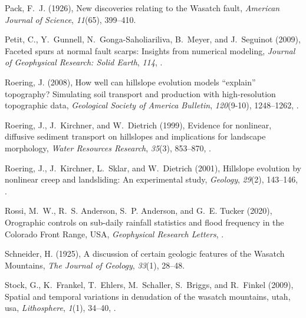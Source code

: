 \begin{thebibliography}{50}
Pack, F.~J. (1926), {New discoveries relating to the Wasatch fault},
  \textit{American Journal of Science}, \textit{11}(65), 399--410.

Petit, C., Y.~Gunnell, N.~Gonga-Saholiariliva, B.~Meyer, and J.~Seguinot
  ({2009}), {Faceted spurs at normal fault scarps: Insights from numerical
  modeling}, \textit{Journal of Geophysical Research: Solid Earth},
  \textit{{114}}, .

Roering, J. (2008), {How well can hillslope evolution models ``explain''
  topography? Simulating soil transport and production with high-resolution
  topographic data}, \textit{Geological Society of America Bulletin},
  \textit{120}(9-10), 1248--1262, .

Roering, J., J.~Kirchner, and W.~Dietrich ({1999}), {Evidence for nonlinear,
  diffusive sediment transport on hillslopes and implications for landscape
  morphology}, \textit{{Water Resources Research}}, \textit{{35}}({3}),
  {853--870}, .

Roering, J., J.~Kirchner, L.~Sklar, and W.~Dietrich ({2001}), {Hillslope
  evolution by nonlinear creep and landsliding: An experimental study},
  \textit{{Geology}}, \textit{{29}}({2}), {143--146},
  .

Rossi, M.~W., R.~S. Anderson, S.~P. Anderson, and G.~E. Tucker (2020),
  {Orographic controls on sub-daily rainfall statistics and flood frequency in
  the Colorado Front Range, USA}, \textit{Geophysical Research Letters},
  .

Schneider, H. (1925), {A discussion of certain geologic features of the Wasatch
  Mountains}, \textit{The Journal of Geology}, \textit{33}(1), 28--48.

Stock, G., K.~Frankel, T.~Ehlers, M.~Schaller, S.~Briggs, and R.~Finkel (2009),
  Spatial and temporal variations in denudation of the wasatch mountains, utah,
  usa, \textit{Lithosphere}, \textit{1}(1), 34--40, .


\end{thebibliography}
